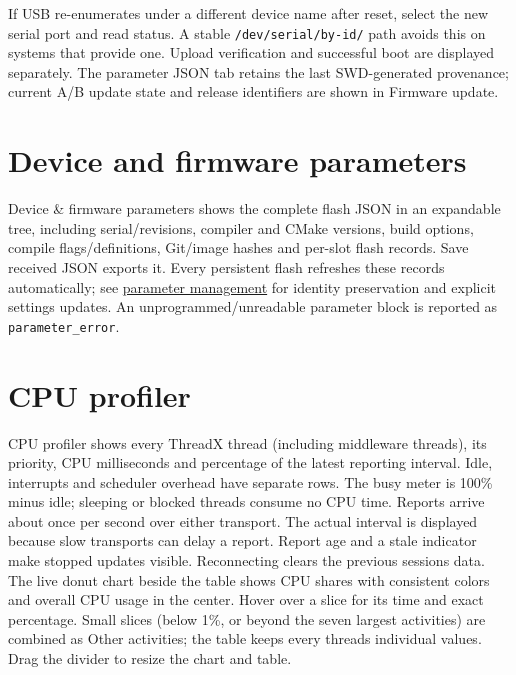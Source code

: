 \documentclass[10pt,a4paper,oneside]{report}
\begin{document}
If USB re-enumerates under a different device name after reset, select the new serial port and read status. A stable \texttt{/\allowbreak{}dev/\allowbreak{}serial/\allowbreak{}by-\allowbreak{}id/\allowbreak{}} path avoids this on systems that provide one. Upload verification and successful boot are displayed separately. The parameter JSON tab retains the last SWD-generated provenance; current A/B update state and release identifiers are shown in Firmware update.

\section{Device and firmware parameters}\label{wiki-tools-device-monitor--device-and-firmware-parameters}

Device \& firmware parameters shows the complete flash JSON in an expandable tree, including serial/revisions, compiler and CMake versions, build options, compile flags/definitions, Git/image hashes and per-slot flash records. Save received JSON exports it. Every persistent flash refreshes these records automatically; see \hyperref[wiki-firmware-parameters--device-parameters-and-build-metadata]{parameter management} for identity preservation and explicit settings updates. An unprogrammed/unreadable parameter block is reported as \texttt{parameter\_\allowbreak{}error}.

\section{CPU profiler}\label{wiki-tools-device-monitor--cpu-profiler}

CPU profiler shows every ThreadX thread (including middleware threads), its priority, CPU milliseconds and percentage of the latest reporting interval. Idle, interrupts and scheduler overhead have separate rows. The busy meter is 100\% minus idle; sleeping or blocked threads consume no CPU time. Reports arrive about once per second over either transport. The actual interval is displayed because slow transports can delay a report. Report age and a stale indicator make stopped updates visible. Reconnecting clears the previous session\textquotesingle s data. The live donut chart beside the table shows CPU shares with consistent colors and overall CPU usage in the center. Hover over a slice for its time and exact percentage. Small slices (below 1\%, or beyond the seven largest activities) are combined as Other activities; the table keeps every thread\textquotesingle s individual values. Drag the divider to resize the chart and table.
\end{document}
